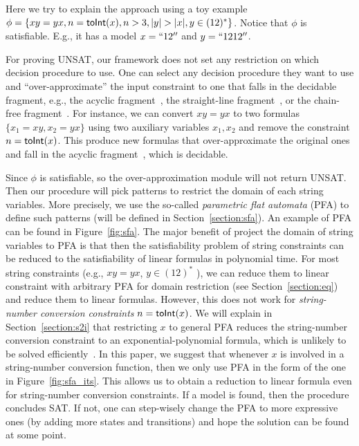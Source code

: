 \documentclass[sigplan,review,anonymous]{acmart}\settopmatter{printfolios=true,printccs=false,printacmref=false}
\begin{document}
Here we try to explain the approach using a toy example $\phi = \{xy=yx, n = \sti{x}, n >3 ,|y|>|x|, y \in (12)^*\}$. Notice that $\phi$ is satisfiable. E.g., it has a model $x=``12''$ and $y=``1212''$.

For proving UNSAT, our framework does not set any restriction on which decision procedure to use. One can select any decision procedure they want to use and ``over-approximate'' the input constraint to one that falls in the decidable fragment, e.g., the acyclic fragment~\cite{abdulla2014string}, the straight-line fragment~\cite{chen2019decision}, or the chain-free fragment~\cite{abdulla2019chain}. For instance, we can convert $xy=yx$ to two formulas $\{x_1=xy, x_2=yx\}$ using two auxiliary variables $x_1,x_2$ and remove the constraint $n=\mbox{\textsf{toInt}($x$)}$. This produce new formulas that over-approximate the original ones and fall in the acyclic fragment~\cite{abdulla2014string}, which is decidable. 

Since $\phi$ is satisfiable, so the over-approximation module will not return UNSAT. Then our procedure will pick patterns to restrict the domain of each string variables. More precisely, we use the so-called \emph{parametric flat automata} (PFA) to define such patterns (will be defined in Section~\ref{section:sfa}). An example of PFA can be found in Figure~\ref{fig:sfa}. The major benefit of project the domain of string variables to PFA is that then the satisfiability problem of string constraints can be reduced to the satisfiability of linear formulas in polynomial time. For most string constraints (e.g., $xy=yx$, $y \in (12)^*$ ), we can reduce them to linear constraint with arbitrary PFA for domain restriction (see Section~\ref{section:eq}) and reduce them to linear formulas. However, this does not work for \emph{string-number conversion constraints} $n = \mbox{\textsf{toInt}($x$)}$. We will explain in Section~\ref{section:s2i} that restricting $x$ to general PFA reduces the string-number conversion constraint to an exponential-polynomial formula, which is unlikely to be solved efficiently~\cite{achatz2008deciding}. In this paper, we suggest that whenever $x$ is involved in a string-number conversion function, then we only use PFA in the form of the one in Figure~\ref{fig:sfa_its}. This allows us to obtain a reduction to linear formula even for string-number conversion constraints. If a model is found, then the procedure concludes SAT.  If not, one can step-wisely change the PFA to more expressive ones (by adding more states and transitions) and hope the solution can be found at some point.
\end{document}
